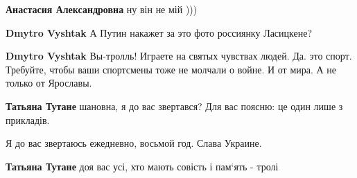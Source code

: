 \begin{itemize}
\begin{itemize}
\begin{itemize}
\textbf{Анастасия Александровна} ну він не мій )))

\end{itemize}

 
\textbf{Dmytro Vyshtak} А Путин накажет за это фото россиянку Ласицкене?


 
\textbf{Dmytro Vyshtak} Вы-тролль! Играете на святых чувствах людей. Да. это
спорт. Требуйте, чтобы ваши спортсмены тоже не молчали о войне. И от мира. А не
только от Ярославы.

\begin{itemize}
 
\textbf{Татьяна Тутане} шановна, я до вас звертався? Для вас поясню: це один лише з прикладів.


 
Я до вас звертаюсь ежедневно, восьмой год. Слава Украине.

 
\textbf{Татьяна Тутане} доя вас усі, хто мають совість і пам‘ять - тролі

 

\end{itemize}
\end{itemize}
\end{itemize}
